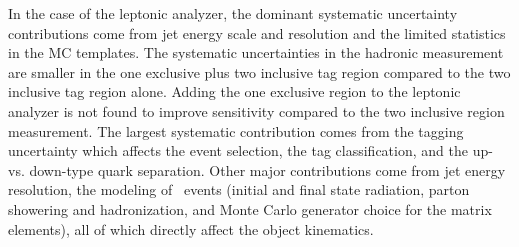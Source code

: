 In the case of the leptonic analyzer, the dominant systematic uncertainty contributions come from jet energy scale and resolution and the limited statistics in the MC templates. The systematic uncertainties in the hadronic measurement are smaller in the one exclusive plus two inclusive \bt tag region compared to the two inclusive tag region alone. Adding the one exclusive region to the leptonic analyzer is not found to improve sensitivity compared to the two inclusive region measurement. The largest systematic contribution comes from the \bt tagging uncertainty which affects the event selection, the \bt tag classification, and the up- vs. down-type quark separation. Other major contributions come from jet energy resolution, the modeling of \ttbar\ events (initial and final state radiation, parton showering and hadronization, and Monte Carlo generator choice for the matrix elements), all of which directly affect the object kinematics.

